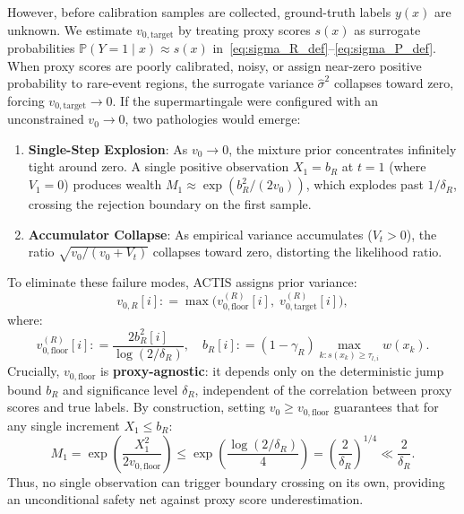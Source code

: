 \documentclass[11pt,a4paper]{article}
\newcommand{\coloneqq}{\mathrel{\mathop:}=}
\begin{document}
However, before calibration samples are collected, ground-truth labels $y(x)$ are unknown. We estimate $v_{0, \text{target}}$ by treating proxy scores $s(x)$ as surrogate probabilities $\mathbb{P}(Y=1 \mid x) \approx s(x)$ in~\eqref{eq:sigma_R_def}--\eqref{eq:sigma_P_def}. When proxy scores are poorly calibrated, noisy, or assign near-zero positive probability to rare-event regions, the surrogate variance $\hat{\sigma}^2$ collapses toward zero, forcing $v_{0, \text{target}} \to 0$. If the supermartingale were configured with an unconstrained $v_0 \to 0$, two pathologies would emerge:
\begin{enumerate}[leftmargin=*]
    \item \textbf{Single-Step Explosion}: As $v_0 \to 0$, the mixture prior concentrates infinitely tight around zero. A single positive observation $X_1 = b_R$ at $t=1$ (where $V_1 = 0$) produces wealth $M_1 \approx \exp(b_R^2 / (2 v_0))$, which explodes past $1/\delta_R$, crossing the rejection boundary on the first sample.
    \item \textbf{Accumulator Collapse}: As empirical variance accumulates ($V_t > 0$), the ratio $\sqrt{v_0 / (v_0 + V_t)}$ collapses toward zero, distorting the likelihood ratio.
\end{enumerate}
To eliminate these failure modes, ACTIS assigns prior variance:
\begin{equation}
v_{0, R}[i] \coloneqq \max\big(v_{0, \text{floor}}^{(R)}[i], \; v_{0, \text{target}}^{(R)}[i]\big),
\end{equation}
where:
\begin{equation}\label{eq:v0_floor_formula}
v_{0, \text{floor}}^{(R)}[i] \coloneqq \frac{2 b_R^2[i]}{\log(2/\delta_R)}, \quad b_R[i] \coloneqq (1 - \gamma_R) \max_{k: s(x_k) \ge \tau_{l, i}} w(x_k).
\end{equation}
Crucially, $v_{0, \text{floor}}$ is \textbf{proxy-agnostic}: it depends only on the deterministic jump bound $b_R$ and significance level $\delta_R$, independent of the correlation between proxy scores and true labels. By construction, setting $v_0 \ge v_{0, \text{floor}}$ guarantees that for any single increment $X_1 \le b_R$:
\begin{equation}
M_1 = \exp\left( \frac{X_1^2}{2 v_{0, \text{floor}}} \right) \le \exp\left( \frac{\log(2/\delta_R)}{4} \right) = \left(\frac{2}{\delta_R}\right)^{1/4} \ll \frac{2}{\delta_R}.
\end{equation}
Thus, no single observation can trigger boundary crossing on its own, providing an unconditional safety net against proxy score underestimation.
\end{document}
